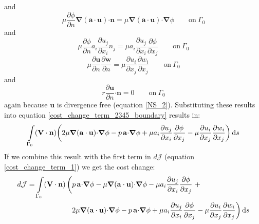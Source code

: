 \documentclass[12pt, a4paper]{article}
\begin{document}
    and
    \begin{equation*}
        \mu \frac{\partial \phi}{\partial n} \boldsymbol{\nabla} (\mathbf{a \cdot u}) \mathbf{\cdot n} = 
        \mu \boldsymbol{\nabla} (\mathbf{a \cdot u}) \mathbf{\cdot} \boldsymbol{\nabla} \phi
        \qquad \text{on} \ \Gamma_0
    \end{equation*}
    and
    \begin{equation*}
        \mu \frac{\partial \phi}{\partial n} a_i \frac{\partial u_j}{\partial x_i} n_j = 
        \mu a_i \frac{\partial u_j}{\partial x_i} \frac{\partial \phi}{\partial x_j}
        \qquad \text{on} \ \Gamma_0
    \end{equation*}
    \begin{equation*}
        \mu \frac{\partial \mathbf{u}}{\partial n} \frac{\partial \mathbf{w}}{\partial n} = 
        \mu \frac{\partial u_i}{\partial x_j} \frac{\partial w_i}{\partial x_j}
        \qquad \text{on} \ \Gamma_0
    \end{equation*}
    and
    \begin{equation*}
        r \frac{\partial \mathbf{u}}{\partial n} \mathbf{\cdot n} = 
        0
        \qquad \text{on} \ \Gamma_0
    \end{equation*}
    again because $\mathbf{u}$ is divergence free (equation \ref{NS_2}). Substituting these results into equation \ref{cost_change_term_2345_boundary} results in:
    \begin{equation}
        \int\limits_{\Gamma_0} (\mathbf{V \cdot n}) \bigg{(}
            2 \mu \boldsymbol{\nabla} (\mathbf{a \cdot u}) \mathbf{\cdot} \boldsymbol{\nabla} \phi - 
            p \, \mathbf{a \cdot} \boldsymbol{\nabla} \phi + 
            \mu a_i \frac{\partial u_j}{\partial x_i} \frac{\partial \phi}{\partial x_j} - 
            \mu \frac{\partial u_i}{\partial x_j} \frac{\partial w_i}{\partial x_j}
        \bigg{)} \, \mathrm{d}s
    \end{equation}
    If we combine this result with the first term in $d \mathcal{J}$ (equation \ref{cost_change_term_1}) we get the cost change:
    \begin{equation}
    \begin{split}
        d \mathcal{J} = 
        \int\limits_{\Gamma_0}(\mathbf{V \cdot n}) \, \bigg{(} &
            p\, \mathbf{a \cdot} \boldsymbol{\nabla} \phi -
            \mu \boldsymbol{\nabla}(\mathbf{a \cdot u}) \mathbf{\cdot} \boldsymbol{\nabla} \phi - 
            \mu a_i \frac{\partial u_j}{\partial x_i} \frac{\partial \phi}{\partial x_j} \ + \\
        &2 \mu \boldsymbol{\nabla} (\mathbf{a \cdot u}) \mathbf{\cdot} \boldsymbol{\nabla} \phi - 
            p \, \mathbf{a \cdot} \boldsymbol{\nabla} \phi + 
            \mu a_i \frac{\partial u_j}{\partial x_i} \frac{\partial \phi}{\partial x_j} - 
            \mu \frac{\partial u_i}{\partial x_j} \frac{\partial w_i}{\partial x_j}
        \bigg{)} \, \mathrm{d}s
    \end{split}
    \end{equation}
\end{document}
